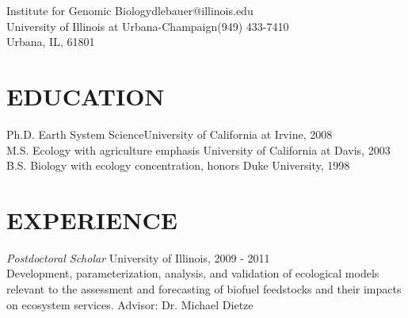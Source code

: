 \documentclass[line,10pt]{res}
\begin{document}

\begin{resume}

Institute for Genomic Biology\hfill dlebauer@illinois.edu\\
University of Illinois at Urbana-Champaign\hfill (949) 433-7410\\
Urbana, IL, 61801 \\


\section{EDUCATION}

 Ph.D. Earth System Science\hfill University of California at Irvine, 2008 \\
 M.S. Ecology with agriculture emphasis \hfill University of California at Davis, 2003   \\ 
 B.S. Biology with ecology concentration, honors \hfill Duke University, 1998 

\section{EXPERIENCE}
               {\sl  Postdoctoral Scholar} \hfill University of Illinois, 2009 - 2011 \\
  Development, parameterization, analysis, and validation of ecological models relevant to the assessment and forecasting of biofuel feedstocks and their impacts on ecosystem services.
  Advisor: Dr. Michael Dietze
		

\end{resume}
\end{document}
